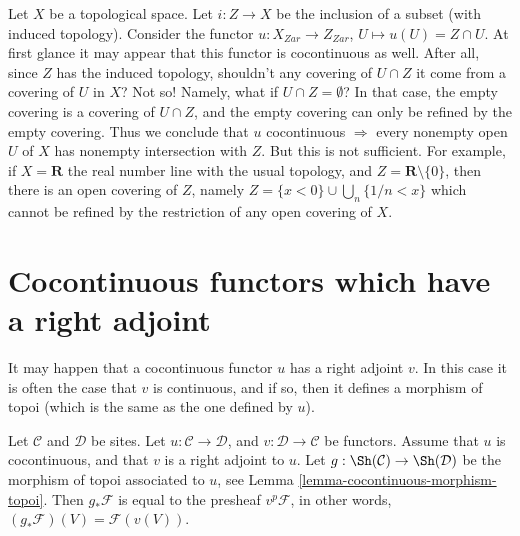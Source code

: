 \begin{example}
\label{example-closed-map-cocontinuous-false}
Let $X$ be a topological space.
Let $i : Z  \to X$ be the inclusion of a subset (with induced
topology). Consider the functor $u : X_{Zar} \to Z_{Zar}$,
$U \mapsto u(U) = Z \cap U$.
At first glance it may appear that this functor is cocontinuous as
well. After all, since $Z$ has the induced topology,
shouldn't any covering of $U\cap Z$ it come from a covering
of $U$ in $X$? Not so! Namely, what if $U \cap Z = \emptyset$?
In that case, the empty covering is a covering of
$U \cap Z$, and the empty covering can only be refined by
the empty covering. Thus we conclude that
$u$ cocontinuous $\Rightarrow$ every nonempty open $U$
of $X$ has nonempty intersection with $Z$.
But this is not sufficient. For example, if
$X = \mathbf{R}$ the real number line with the usual
topology, and $Z = \mathbf{R} \setminus \{0\}$, then
there is an open covering of $Z$, namely
$Z = \{x < 0\} \cup \bigcup_n \{1/n < x\}$ which
cannot be refined by the restriction of any
open covering of $X$.
\end{example}







\section{Cocontinuous functors which have a right adjoint}
\label{section-cocontinuous-adjoint}

\noindent
It may happen that a cocontinuous functor $u$ has a right adjoint $v$.
In this case it is often the case that $v$ is continuous, and if so,
then it defines a morphism of topoi (which is the same as the one
defined by $u$).

\begin{lemma}
\label{lemma-have-functor-other-way}
Let $\mathcal{C}$ and $\mathcal{D}$ be sites. Let
$u : \mathcal{C} \to \mathcal{D}$, and $v : \mathcal{D} \to \mathcal{C}$
be functors. Assume that $u$ is cocontinuous,
and that $v$ is a right adjoint to $u$.
Let $g : \Sh(\mathcal{C}) \to \Sh(\mathcal{D})$ be
the morphism of topoi associated to $u$, see
Lemma \ref{lemma-cocontinuous-morphism-topoi}.
Then $g_*\mathcal{F}$ is equal to the presheaf
$v^p\mathcal{F}$, in other words, $(g_*\mathcal{F})(V) = \mathcal{F}(v(V))$.
\end{lemma}

